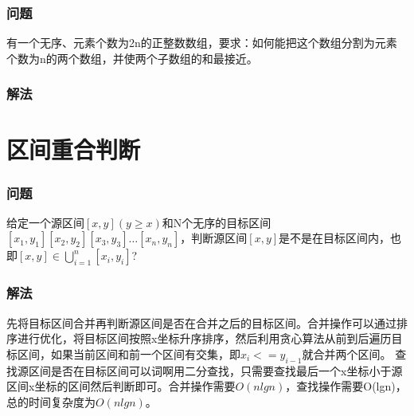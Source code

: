 \subsubsection{问题}
有一个无序、元素个数为2n的正整数数组，要求：如何能把这个数组分割为元素个数为n的两个数组，并使两个子数组的和最接近。

\subsubsection{解法}



\section{区间重合判断} %
\label{sec:interval-overlapping}

\subsubsection{问题}
给定一个源区间$[x,y](y\geq x)$和N个无序的目标区间$[x_1,y_1][x_2,y_2][x_3,y_3]\dots[x_n,y_n]$，判断源区间$[x,y]$是不是在目标区间内，也即$[x,y]\in \bigcup\limits_{i=1}^{n}[x_i,y_i]$?

\subsubsection{解法}
先将目标区间合并再判断源区间是否在合并之后的目标区间。合并操作可以通过排序进行优化，将目标区间按照x坐标升序排序，然后利用贪心算法从前到后遍历目标区间，如果当前区间和前一个区间有交集，即$x_i<=y_{i-1}$就合并两个区间。
查找源区间是否在目标区间可以词啊用二分查找，只需要查找最后一个x坐标小于源区间x坐标的区间然后判断即可。合并操作需要$O(nlgn)$，查找操作需要O(lgn)，总的时间复杂度为$O(nlgn)$。

